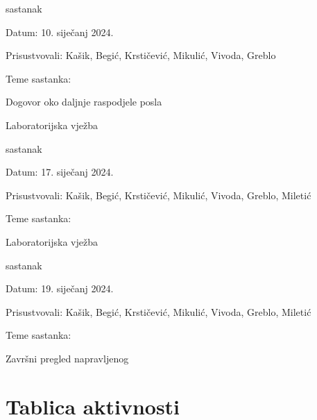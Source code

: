 \begin{packed_enum}
	\item  sastanak
	\item[] \begin{packed_item}
		\item Datum: 10. siječanj 2024.
		\item Prisustvovali: Kašik, Begić, Krstičević, Mikulić, Vivoda, Greblo
		\item Teme sastanka:
		\begin{packed_item}
			\item  Dogovor oko daljnje raspodjele posla
			\item  Laboratorijska vježba
		\end{packed_item}
	\end{packed_item}
	
	\item  sastanak
	\item[] \begin{packed_item}
		\item Datum: 17. siječanj 2024.
		\item Prisustvovali: Kašik, Begić, Krstičević, Mikulić, Vivoda, Greblo, Miletić
		\item Teme sastanka:
		\begin{packed_item}
			\item  Laboratorijska vježba
		\end{packed_item}
	\end{packed_item}
	
	\item  sastanak
	\item[] \begin{packed_item}
		\item Datum: 19. siječanj 2024.
		\item Prisustvovali: Kašik, Begić, Krstičević, Mikulić, Vivoda, Greblo, Miletić
		\item Teme sastanka:
		\begin{packed_item}
			\item  Završni pregled napravljenog
		\end{packed_item}
	\end{packed_item}
	
	
\end{packed_enum}

\eject
\section*{Tablica aktivnosti}



